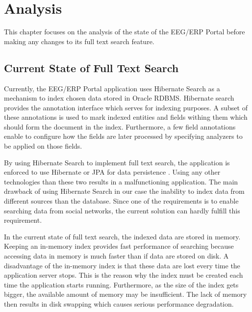 \chapter{Analysis}
\label{chap:analysis}


This chapter focuses on the analysis of the state of the EEG/ERP Portal before making any changes to its full text search feature.

\section{Current State of Full Text Search}
\label{sec:currentStateFulltext}

Currently, the EEG/ERP Portal application uses Hibernate Search as a mechanism to index chosen data stored in Oracle RDBMS.
Hibernate search provides the annotation interface which serves for indexing purposes. 
A subset of these annotations is used to mark indexed entities and fields withing them which should form the document in the index. Furthermore, a few field annotations enable to configure how the fields are later processed by specifying analyzers to be applied on those fields.



By using Hibernate Search to implement full text search, the application is enforced to use Hibernate or JPA for data persistence \cite{Bernard:2008:HSA:1524089}.
Using any other technologies than these two results in a malfunctioning application.
The main drawback of using Hibernate Search in our case the inability to index data from different sources than the database. 
Since one of the requirements is to enable searching data from social networks, the current solution can hardly fulfill this requirement. 



In the current state of full text search, the indexed data are stored in memory. 
Keeping an in-memory index provides fast performance of searching because accessing data in memory is much faster than if data are stored on disk. 
A disadvantage of the in-memory index is that these data are lost every time the application server stops.
This is the reason why the index must be created each time the application starts running.
Furthermore, as the size of the index gets bigger, the available amount of memory may be insufficient.
The lack of memory then results in disk swapping which causes serious performance degradation.

